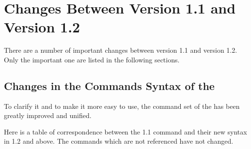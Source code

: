 \section{Changes Between Version 1.1 and Version 1.2}

There are a number of important changes between version 1.1 and version 1.2.
Only the important one are listed in the following sections.



\subsection{Changes in the Commands Syntax of the \CPK{}}

To clarify it and to make it more easy to use, the command set of the
\CPK{} has been greatly improved and unified.

Here is a table of correspondence between the 1.1 command and their new
syntax in 1.2 and above. The commands which are not referenced have not changed.

